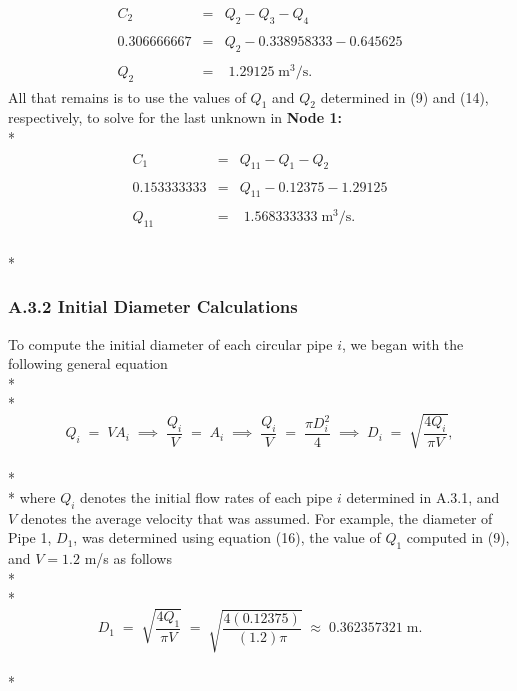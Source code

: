 \documentclass[]{article}
\begin{document}
\begin{align}
\begin{array}{rcl}
C_2 &=& Q_2-Q_3-Q_4 \\ \\
0.306666667 &=&  Q_2 - 0.338958333 -0.645625 \\ \\ 
Q_2 &=& \; 1.29125 \; \text{m}^3/\text{s}.
\end{array} 
\end{align}
All that remains is to use the values of $Q_1$ and $Q_2$ determined in (9) and (14), respectively, to solve for the last unknown in \textbf{Node 1:} \\*
\begin{align}
\begin{array}{rcl}
C_1 &=& Q_{11}-Q_1-Q_2 \\ \\
0.153333333 &=&  Q_{11} -0.12375 - 1.29125 \\ \\ 
Q_{11} &=& \; 1.568333333 \; \text{m}^3/\text{s}.
\end{array} 
\end{align} \\* 
\subsubsection{A.3.2 Initial Diameter Calculations}
To compute the initial diameter of each circular pipe $i$, we began with the following general equation \\* \\*
\begin{equation}
Q_i \; = \; VA_i \; \implies \; \dfrac{Q_i}{V} \; = \; A_i \; \implies \; \dfrac{Q_i}{V} \; = \; \dfrac{\pi D_i^2}{4} \; \implies \; D_i \; = \; \sqrt{\dfrac{4Q_i}{\pi V}},
\end{equation} \\* \\*
where $Q_i$ denotes the initial flow rates of each pipe $i$ determined in A.3.1, and $V$ denotes the average velocity that was assumed. For example, the diameter of Pipe 1, $D_1$, was determined using equation (16), the value of $Q_1$ computed in (9), and $V=1.2$ m/s as follows \\* \\*
\begin{equation}
\nonumber
D_1\; = \; \sqrt{\dfrac{4Q_1}{\pi V}} \; = \; \sqrt{\dfrac{4(0.12375)}{(1.2) \pi}} \; \approx \; 0.362357321 \; \text{m}.
\end{equation} \\*
\end{document}
